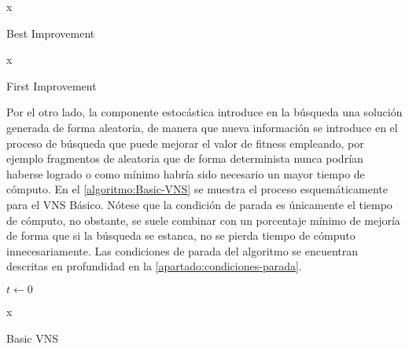 \begin{algorithm}[htbp]
\DontPrintSemicolon
{}
\medskip

\Return x \;

\caption{Best Improvement}
\label{algoritmo:BestImprovement}
\end{algorithm}

\begin{algorithm}[htbp]
	\DontPrintSemicolon
	\medskip
	
	\Return x \;
	
	\caption{First Improvement}
	\label{algoritmo:FirstImprovement}
\end{algorithm}

Por el otro lado, la componente estocástica introduce en la búsqueda una solución generada de forma aleatoria, de manera que nueva información se introduce en el proceso de búsqueda que puede mejorar el valor de fitness empleando, por ejemplo fragmentos de aleatoria que de forma determinista nunca podrían haberse logrado o como mínimo habría sido necesario un mayor tiempo de cómputo. En el \autoref{algoritmo:Basic-VNS} se muestra el proceso esquemáticamente para el VNS Básico. Nótese que la condición de parada es únicamente el tiempo de cómputo, no obstante, se suele combinar con un porcentaje mínimo de mejoría de forma que si la búsqueda se estanca, no se pierda tiempo de cómputo innecesariamente. Las condiciones de parada del algoritmo se encuentran descritas en profundidad en la \autoref{apartado:condiciones-parada}.

\begin{algorithm}[htbp]
	\DontPrintSemicolon

	\bigskip
	
	$t \leftarrow 0$ \;
	

	\Return x \;
	
	\caption{Basic VNS \cite{vns}}
	\label{algoritmo:Basic-VNS}
	

\end{algorithm}

